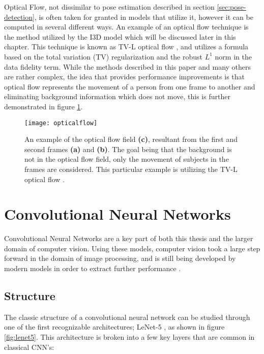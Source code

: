 Optical Flow, not dissimilar to pose estimation described in section \ref{sec:pose-detection}, is often taken for granted in models that utilize it, however it can be computed in several different ways. An example of an optical flow technique is the method utilized by the I3D model \cite{i3d} which will be discussed later in this chapter. This technique is known as TV-L optical flow \cite{TV-L}, and utilizes a formula based on the total variation (TV) regularization and the robust $L^1$ norm in the data fidelity term. While the methods described in this paper and many others are rather complex, the idea that provides performance improvements is that optical flow represents the movement of a person from one frame to another and eliminating background information which does not move, this is further demonstrated in figure \ref{fig:opticalflow}.

\begin{figure}[ht]
	\texttt{[image: opticalflow]}
	\centering
	\caption{An example of the optical flow field \textbf{(c)}, resultant from the first and second frames \textbf{(a)} and \textbf{(b)}. The goal being that the background is not in the optical flow field, only the movement of subjects in the frames are considered. This particular example is utilizing the TV-L optical flow \cite{TV-L}.}
	\label{fig:opticalflow}
\end{figure}


\section{Convolutional Neural Networks}

Convolutional Neural Networks are a key part of both this thesis and the larger domain of computer vision. Using these models, computer vision took a large step forward in the domain of image processing, and is still being developed by modern models in order to extract further performance \cite{deeplearning}.

\subsection{Structure}

The classic structure of a convolutional neural network can be studied through one of the first recognizable architectures; LeNet-5 \cite{lenet5}, as shown in figure \ref{fig:lenet5}. This architecture is broken into a few key layers that are common in classical CNN's:

